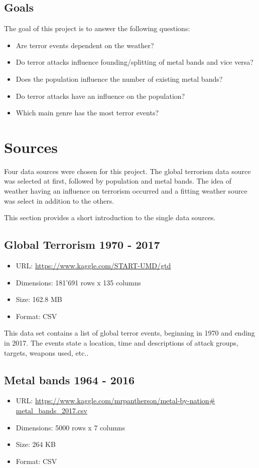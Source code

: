 \subsection{Goals}
The goal of this project is to answer the following questions:
\begin{itemize}
	\item Are terror events dependent on the weather?
	\item Do terror attacks influence founding/splitting of metal bands and vice versa?
	\item Does the population influence the number of existing metal bands?
	\item Do terror attacks have an influence on the population?
	\item Which main genre has the most terror events?
\end{itemize}

\section{Sources}
Four data sources were chosen for this project. The global terrorism data source was selected at first, followed by population and metal bands. The idea of weather having an influence on terrorism occurred and a fitting weather source was select in addition to the others.

This section provides a short introduction to the single data sources.

\subsection{Global Terrorism 1970 - 2017}
\begin{itemize}
	\item URL: \url{https://www.kaggle.com/START-UMD/gtd}
	\item Dimensions: 181'691 rows x 135 columns
	\item Size: 162.8 MB
	\item Format: CSV
\end{itemize}

This data set contains a list of global terror events, beginning in 1970 and ending in 2017. The events state a location, time and descriptions of attack groups, targets, weapons used, etc.. 
	
\subsection{Metal bands 1964 - 2016}
\begin{itemize}
	\item URL: \url{https://www.kaggle.com/mrpantherson/metal-by-nation# metal_bands_2017.csv}
	\item Dimensions: 5000 rows x 7 columns
	\item Size: 264 KB
	\item Format: CSV
\end{itemize}

